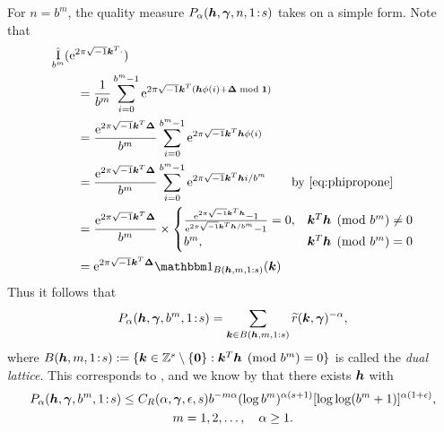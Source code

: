 \documentclass[authoryear]{elsarticle}
\newcommand{\tr}{\widetilde{r}}
\DeclareMathOperator{\appxint}{\hat{I}}
\newcommand{\onetos}{1\!:\!s}
\begin{document}
For $n = b^m$, the quality measure $P_\alpha(\vh,\vgamma,n,\onetos)$ takes on a simple form.  Note that
\begin{align}\label{Eq:DualLattice}
    \MoveEqLeft{\appxint_{b^m}(\me^{2 \pi \sqrt{-1} \vk^T \cdot})} \\
    \nonumber
    &= \frac 1{b^m} \sum_{i=0}^{b^m-1} \me^{2 \pi \sqrt{-1} \vk^T (\vh\phi(i) + \vDelta \bmod{\vone})} \\
    \nonumber
    &= \frac {\me^{2 \pi \sqrt{-1} \vk^T \vDelta}}{b^m} \sum_{i=0}^{b^m-1} \me^{2 \pi \sqrt{-1} \vk^T \vh\phi(i)} \\
    \nonumber
    &= \frac {\me^{2 \pi \sqrt{-1} \vk^T \vDelta}}{b^m} \sum_{i=0}^{b^m-1} \me^{2 \pi \sqrt{-1} \vk^T \vh i/b^m} \qquad \text{by \eqref{eq:phipropone}}\\
    \nonumber
    &= \frac {\me^{2 \pi \sqrt{-1} \vk^T \vDelta}}{b^m} \times
    \begin{cases}
    \frac{\me^{2 \pi \sqrt{-1} \vk^T \vh} - 1}{\me^{2 \pi \sqrt{-1} \vk^T \vh/b^m} - 1} = 0, & \vk^T \vh \pmod{b^m} \ne 0\\
    b^m, & \vk^T \vh \pmod{b^m} = 0
    \end{cases} \\
    \nonumber
    & = \me^{2 \pi \sqrt{-1} \vk^T \vDelta} \bbone_{B(\vh,m,1:s)}(\vk)
\end{align}
Thus it follows that
\begin{equation} \label{eq:Palphadual}
    P_\alpha(\vh,\vgamma,b^m,\onetos) = \sum_{\vk \in B(\vh,m,1:s)} \tr(\vk,\vgamma)^{-\alpha},
\end{equation}
where $B(\vh,m,\onetos) : = \{\vk \in  \integers^s \setminus \{\vzero\} : \vk^T \vh \pmod{b^m} = 0\}$ is called the \emph{dual lattice}.  This corresponds to \cite[Equation (3)]{HicNie03a}, and we know by \cite[Theorem 5]{HicNie03a} that  there exists $\boldsymbol{h}$ with
\begin{multline} \label{eq:Niedbd}
    P_{\alpha}(\vh,\vgamma,b^m,\onetos) \le C_{R}(\alpha,\vgamma,\epsilon,s)
    b^{-m\alpha} (\log b^{m})^{\alpha(s+1)} [\log \log (
    b^m+1)]^{\alpha(1+\epsilon)}, \\ m = 1, 2,\ldots, \quad \alpha \ge 1.
\end{multline}
\end{document}
